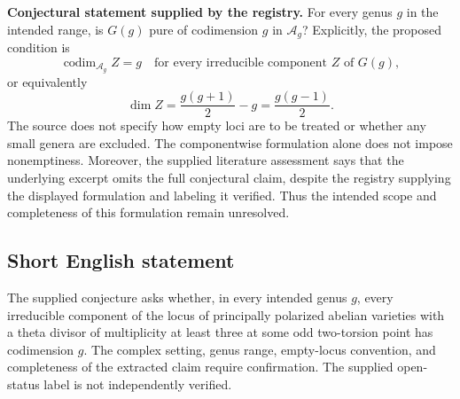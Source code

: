 \documentclass[11pt]{article}
\begin{document}
\textbf{Conjectural statement supplied by the registry.} For every genus \(g\) in the intended range, is \(G(g)\) pure of codimension \(g\) in \(\mathcal A_g\)? Explicitly, the proposed condition is
\[
\operatorname{codim}_{\mathcal A_g}Z=g
\quad\text{for every irreducible component }Z\text{ of }G(g),
\]
or equivalently
\[
\dim Z=\frac{g(g+1)}2-g=\frac{g(g-1)}2.
\]
The source does not specify how empty loci are to be treated or whether any small genera are excluded. The componentwise formulation alone does not impose nonemptiness. Moreover, the supplied literature assessment says that the underlying excerpt omits the full conjectural claim, despite the registry supplying the displayed formulation and labeling it verified. Thus the intended scope and completeness of this formulation remain unresolved.
\subsection{Short English statement}
The supplied conjecture asks whether, in every intended genus \(g\), every irreducible component of the locus of principally polarized abelian varieties with a theta divisor of multiplicity at least three at some odd two-torsion point has codimension \(g\). The complex setting, genus range, empty-locus convention, and completeness of the extracted claim require confirmation. The supplied open-status label is not independently verified.
\end{document}
